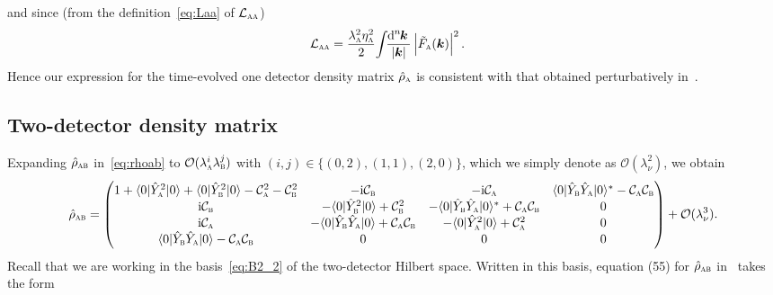 \documentclass[pra,nofootinbib,floats,aps,twocolumn,tightenlines,superscriptaddress]{revtex4-1}
\renewcommand*\d[2][]{%
	\mathrm{d}%
	\ifx\relax#1\relax\else
	\rule{-0.02em}{1.5ex}^{#1}\rule{0.08em}{0ex}\!
	\fi
	#2\,
}
\newcommand{\ket}[1]{| {#1} \rangle}
\newcommand{\bra}[1]{\langle {#1} |}
\newcommand{\ii}{\mathrm{i}}
\newcommand{\rhoa}{\hat{\rho}_\textsc{a}}
\newcommand{\rhoab}{\hat{\rho}_\textsc{ab}}
\newcommand{\Ya}{\hat{Y}_\textsc{a}}
\newcommand{\Yb}{\hat{Y}_\textsc{b}}
\newcommand{\ca}{\mathcal{C}_\textsc{a}}
\newcommand{\cb}{\mathcal{C}_\textsc{b}}
\begin{document}
and since (from the definition~\eqref{eq:Laa} of $\mathcal{L}_\textsc{aa}$)
\begin{align}
    \mathcal{L}_\textsc{aa}
    &=
    \frac{\lambda_\textsc{a}^2
    \eta_\textsc{a}^2}{2}
    \!\int\!\!
    \frac{\d[n]{\bm k}}{|\bm{k}|}
    \left| 
    \tilde{F}_\textsc{a}(\bm k)
    \right|^2.
\end{align}
Hence our expression for the time-evolved one detector density matrix $\rhoa$ is consistent with that obtained perturbatively in~\cite{Simidzija2017b}.

\subsection{Two-detector density matrix}
\label{Appendix:pert2}

Expanding $\rhoab$ in~\eqref{eq:rhoab} to $\mathcal{O}(\lambda_\textsc{a}^i\lambda_\textsc{b}^j)$ with $(i,j)\in\{(0,2),(1,1),(2,0)\}$, which we simply denote as $\mathcal{O}(\lambda_\nu^2)$, we obtain
\begin{equation}
\label{eq:rho_ab_pert1}
    \rhoab
    =
\begin{pmatrix}
    1+\bra{0}\Ya^2\ket{0}+\bra{0}\Yb^2\ket{0}-\ca^2-\cb^2 &
    -\ii\cb & -\ii\ca & \bra{0}\Yb\Ya\ket{0}^*-\ca\cb
    \\
    \ii\cb & -\bra{0}\Yb^2\ket{0} +\cb^2 & -\bra{0}\Yb\Ya\ket{0}^* +\ca\cb & 0
    \\
    \ii\ca & -\bra{0}\Yb\Ya\ket{0} +\ca\cb & -\bra{0}\Ya^2\ket{0} +\ca^2 & 0
    \\
    \bra{0}\Yb\Ya\ket{0}-\ca\cb & 0 & 0 & 0
\end{pmatrix}
+\mathcal{O}(\lambda_\nu^3).
\end{equation}
Recall that we are working in the basis~\eqref{eq:B2_2} of the two-detector Hilbert space. Written in this basis, equation (55) for $\rhoab$ in~\cite{Simidzija2017b} takes the form
\end{document}
